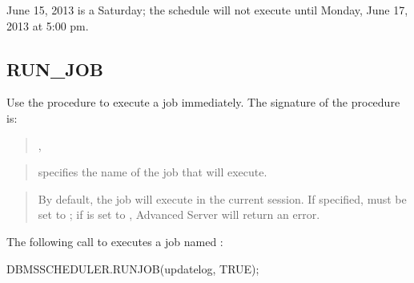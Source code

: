 \documentclass[letterpaper,10pt,english,openany,oneside]{sphinxmanual}
\begin{document}
June 15, 2013 is a Saturday; the schedule will not execute until Monday,
June 17, 2013 at 5:00 pm.

\newpage


\subsection{RUN\_JOB}
\label{\detokenize{run_job::doc}}\label{\detokenize{run_job:run-job}}
Use the  procedure to execute a job immediately. The signature
of the  procedure is:
\begin{quote}

\begin{DUlineblock}{0em}
\item[] 
\item[] ,
\item[] 
\end{DUlineblock}
\end{quote}


\begin{quote}

 specifies the name of the job that will execute.
\end{quote}

\begin{quote}

By default, the job will execute in the current session. If
specified,  must be set to  ; if
 is set to , Advanced Server will return
an error.
\end{quote}


The following call to  executes a job named :

%
\begin{sphinxVerbatim}[commandchars=\\\{\}]
DBMS\PYGZus{}SCHEDULER.RUN\PYGZus{}JOB(\PYGZsq{}update\PYGZus{}log\PYGZsq{}, TRUE);
\end{sphinxVerbatim}
\end{document}
